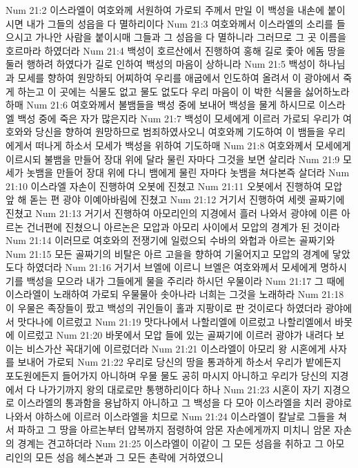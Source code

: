 Num 21:2  이스라엘이 여호와께 서원하여 가로되 주께서 만일 이 백성을 내손에 붙이시면 내가 그들의 성읍을 다 멸하리이다
Num 21:3  여호와께서 이스라엘의 소리를 들으시고 가나안 사람을 붙이시매 그들과 그 성읍을 다 멸하니라 그러므로 그 곳 이름을 호르마라 하였더라
Num 21:4  백성이 호르산에서 진행하여 홍해 길로 좇아 에돔 땅을 둘러 행하려 하였다가 길로 인하여 백성의 마음이 상하니라
Num 21:5  백성이 하나님과 모세를 향하여 원망하되 어찌하여 우리를 애굽에서 인도하여 올려서 이 광야에서 죽게 하는고 이 곳에는 식물도 없고 물도 없도다 우리 마음이 이 박한 식물을 싫어하노라 하매
Num 21:6  여호와께서 불뱀들을 백성 중에 보내어 백성을 물게 하시므로 이스라엘 백성 중에 죽은 자가 많은지라
Num 21:7  백성이 모세에게 이르러 가로되 우리가 여호와와 당신을 향하여 원망하므로 범죄하였사오니 여호와께 기도하여 이 뱀들을 우리에게서 떠나게 하소서 모세가 백성을 위하여 기도하매
Num 21:8  여호와께서 모세에게 이르시되 불뱀을 만들어 장대 위에 달라 물린 자마다 그것을 보면 살리라
Num 21:9  모세가 놋뱀을 만들어 장대 위에 다니 뱀에게 물린 자마다 놋뱀을 쳐다본즉 살더라
Num 21:10  이스라엘 자손이 진행하여 오봇에 진쳤고
Num 21:11  오봇에서 진행하여 모압 앞 해 돋는 편 광야 이예아바림에 진쳤고
Num 21:12  거기서 진행하여 세렛 골짜기에 진쳤고
Num 21:13  거기서 진행하여 아모리인의 지경에서 흘러 나와서 광야에 이른 아르논 건너편에 진쳤으니 아르논은 모압과 아모리 사이에서 모압의 경계가 된 것이라
Num 21:14  이러므로 여호와의 전쟁기에 일렀으되 수바의 와헙과 아르논 골짜기와
Num 21:15  모든 골짜기의 비탈은 아르 고을을 향하여 기울어지고 모압의 경계에 닿았도다 하였더라
Num 21:16  거기서 브엘에 이르니 브엘은 여호와께서 모세에게 명하시기를 백성을 모으라 내가 그들에게 물을 주리라 하시던 우물이라
Num 21:17  그 때에 이스라엘이 노래하여 가로되 우물물아 솟아나라 너희는 그것을 노래하라
Num 21:18  이 우물은 족장들이 팠고 백성의 귀인들이 홀과 지팡이로 판 것이로다 하였더라 광야에서 맛다나에 이르렀고
Num 21:19  맛다나에서 나할리엘에 이르렀고 나할리엘에서 바못에 이르렀고
Num 21:20  바못에서 모압 들에 있는 골짜기에 이르러 광야가 내려다 보이는 비스가산 꼭대기에 이르렀더라
Num 21:21  이스라엘이 아모리 왕 시혼에게 사자를 보내어 가로되
Num 21:22  우리로 당신의 땅을 통과하게 하소서 우리가 밭에든지 포도원에든지 들어가지 아니하며 우물 물도 공히 마시지 아니하고 우리가 당신의 지경에서 다 나가기까지 왕의 대로로만 통행하리이다 하나
Num 21:23  시혼이 자기 지경으로 이스라엘의 통과함을 용납하지 아니하고 그 백성을 다 모아 이스라엘을 치러 광야로 나와서 야하스에 이르러 이스라엘을 치므로
Num 21:24  이스라엘이 칼날로 그들을 쳐서 파하고 그 땅을 아르논부터 얍복까지 점령하여 암몬 자손에게까지 미치니 암몬 자손의 경계는 견고하더라
Num 21:25  이스라엘이 이같이 그 모든 성읍을 취하고 그 아모리인의 모든 성읍 헤스본과 그 모든 촌락에 거하였으니
